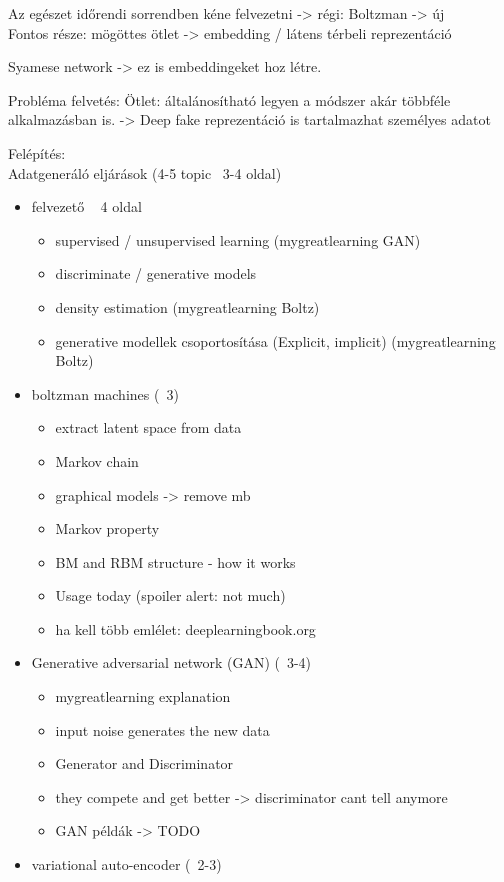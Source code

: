 Az egészet időrendi sorrendben kéne felvezetni -> régi: Boltzman -> új \\
Fontos része: mögöttes ötlet -> embedding / látens térbeli reprezentáció

Syamese network -> ez is embeddingeket hoz létre.

Probléma felvetés:
Ötlet: általánosítható legyen a módszer akár többféle alkalmazásban is. -> Deep fake reprezentáció is tartalmazhat személyes adatot

Felépítés: \\
Adatgeneráló eljárások (4-5 topic ~3-4 oldal)
\begin{itemize}
	\item felvezető ~ 4 oldal 
	\begin{itemize}
		\item supervised / unsupervised learning (mygreatlearning GAN)
		\item discriminate / generative models
		\item density estimation (mygreatlearning Boltz)
		\item generative modellek csoportosítása (Explicit, implicit) (mygreatlearning Boltz)
	\end{itemize}
	\item boltzman machines (~3)
	\begin{itemize}
		\item extract latent space from data
		\item Markov chain
		\item graphical models -> remove mb
		\item Markov property
		\item BM and RBM structure - how it works
		\item Usage today (spoiler alert: not much)
		\item ha kell több emlélet: deeplearningbook.org
	\end{itemize}
	\item Generative adversarial network (GAN) (~3-4)
	\begin{itemize}
		\item mygreatlearning explanation
		\item input noise generates the new data
		\item Generator and Discriminator
		\item they compete and get better -> discriminator cant tell anymore
		\item GAN példák -> TODO
	\end{itemize}
	\item variational auto-encoder (~2-3)

\end{itemize}
